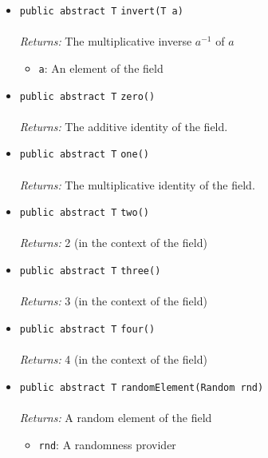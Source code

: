 \begin{itemize}
\item \lstinline|public abstract T| \lstinline|invert|\lstinline|(T a)|\\ \\[-0.6em]
\emph{Returns:} The multiplicative inverse $a^{-1}$ of $a$
\begin{itemize}
\item \lstinline|a|: An element of the field
\end{itemize}



\item \lstinline|public abstract T| \lstinline|zero|\lstinline|()|\\ \\[-0.6em]
\emph{Returns:} The additive identity of the field.



\item \lstinline|public abstract T| \lstinline|one|\lstinline|()|\\ \\[-0.6em]
\emph{Returns:} The multiplicative identity of the field.



\item \lstinline|public abstract T| \lstinline|two|\lstinline|()|\\ \\[-0.6em]
\emph{Returns:} 2 (in the context of the field)



\item \lstinline|public abstract T| \lstinline|three|\lstinline|()|\\ \\[-0.6em]
\emph{Returns:} 3 (in the context of the field)



\item \lstinline|public abstract T| \lstinline|four|\lstinline|()|\\ \\[-0.6em]
\emph{Returns:} 4 (in the context of the field)



\item \lstinline|public abstract T| \lstinline|randomElement|\lstinline|(Random rnd)|\\ \\[-0.6em]
\emph{Returns:} A random element of the field
\begin{itemize}
\item \lstinline|rnd|: A randomness provider
\end{itemize}




\end{itemize}
